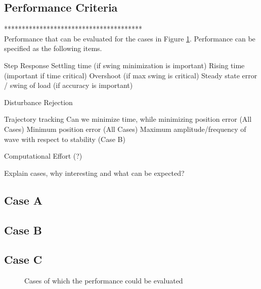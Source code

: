 \subsection{Performance Criteria}
***************************************\\
Performance that can be evaluated for the cases in Figure \ref{fig:routes}. Performance can be specified as the following items.
\begin{outline}
	\1 Step Response
	\2 Settling time (if swing minimization is important)
	\2 Rising time (important if time critical)
	\2 Overshoot (if max swing is critical)
	\2 Steady state error / swing of load (if accuracy is important)
	
	\1 Disturbance Rejection
	
	\1 Trajectory tracking
	\2 Can we minimize time, while minimizing position error (All Cases)
	\2 Minimum position error (All Cases)
	\2 Maximum amplitude/frequency of wave with respect to stability (Case B)
	
	\1 Computational Effort (?)
\end{outline}

Explain cases, why interesting and what can be expected?\\

\subsection{Case A}
\subsection{Case B}
\subsection{Case C}

\begin{figure}[h!]
	\centering
	\caption{Cases of which the performance could be evaluated \label{fig:routes}}
\end{figure}

